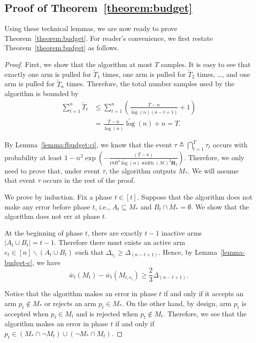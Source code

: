 \documentclass{article}
\newcommand{\M}{\mathcal M}
\newcommand{\del}{\backslash}
\DeclareMathOperator{\rank}{width}
\newcommand{\barlog}{\tilde{\log}}
\begin{document}
\subsection{Proof of Theorem~\ref{theorem:budget}}

Using these technical lemmas, we are now ready to prove Theorem~\ref{theorem:budget}.
For reader's convenience, we first restate Theorem~\ref{theorem:budget} as follows.
\realfixbudget*

\begin{proof}
First, we show that the algorithm at most $T$ samples.
It is easy to see that exactly one arm is pulled for $\tilde T_1$ times, one arm is pulled for $\tilde T_2$ times, \ldots, and one arm is pulled for $\tilde T_n$ times. 
Therefore, the total number samples used by the algorithm is bounded by
\begin{align*}
\sum_{t=1}^n \tilde T_t 
&\le \sum_{t=1}^n \left(\frac{T-n}{\barlog(n)(n-t+1)} +1\right)\\
&= \frac{T-n}{\barlog(n)}\barlog(n)+n = T.
\end{align*}



By Lemma~\ref{lemma:fbudget:ci}, we know that the event $\tau \triangleq \bigcap_{t=1}^T \tau_t$ occurs with probability at least
$1-n^2  \exp\left(-\frac{(T-n)}{18 R^2 \barlog(n) \rank(\M)^2 \mathbf H_2} \right)$.
Therefore, we only need to prove that, under event $\tau$, the algorithm outputs $M_*$.
We will assume that event $\tau$ occurs in the rest of the proof.


We prove by induction. Fix a phase $t \in [t]$.
Suppose that the algorithm does not make any error before phase $t$, i.e., $A_t \subseteq M_*$ and $B_t \cap M_* = \emptyset$.
We show that the algorithm does not err at phase $t$.

At the beginning of phase $t$, there are exactly $t-1$ inactive arms $|A_t \cup B_t| = t-1$. 
Therefore there must exists an active arm $e_t \in [n]\del (A_t\cup B_t)$ such that 
$\Delta_{e_t} \ge \Delta_{(n-t+1)}$.
Hence, by Lemma~\ref{lemma-budget-c}, we have
\begin{equation}
\label{eq-fbdg-upper}
\bar w_t(M_t)- \bar w_t(M_{t,e_t}) \ge \frac23\Delta_{(n-t+1)}.
\end{equation}

Notice that the algorithm makes an error in phase $t$ if and only if it accepts an arm $p_t \not\in M_*$ or rejects an arm $p_t \in M_*$.
On the other hand, by design, arm $p_t$ is accepted when $p_t\in M_t$ and  is rejected when $p_t \not \in M_t$.
Therefore, we see that the algorithm makes an error in phase $t$ if and only if
$p_t \in (M_* \cap \neg M_t) \cup (\neg M_* \cap M_t)$.


\end{proof}
\end{document}
